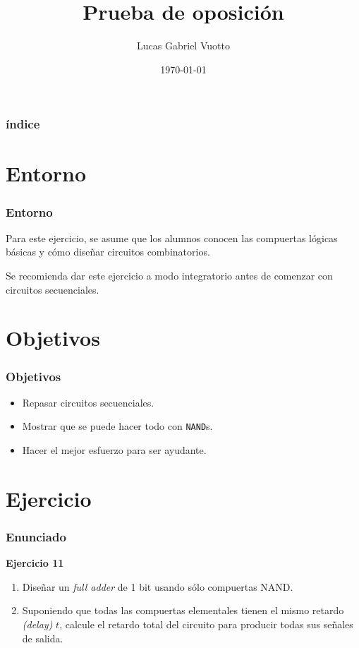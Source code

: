 \documentclass[mathserif,hyperref={pdfpagelabels=false}]{beamer}
\title{Prueba de oposición}
\author{Lucas Gabriel Vuotto}
\date{\today}
\begin{document}
\begin{frame}
\titlepage %
\end{frame}


\begin{frame}
\frametitle{índice}
\tableofcontents
\end{frame}


\section{Entorno}

\begin{frame}
\frametitle{Entorno}
Para este ejercicio, se asume que los alumnos conocen las compuertas lógicas
básicas y cómo diseñar circuitos combinatorios.

Se recomienda dar este ejercicio a modo integratorio antes de comenzar con
circuitos secuenciales.
\end{frame}


\section{Objetivos}

\begin{frame}
\frametitle{Objetivos}
\begin{itemize}
  \item Repasar circuitos secuenciales.
  \item Mostrar que se puede hacer todo con \texttt{NAND}s.
  \item Hacer el mejor esfuerzo para ser ayudante.
\end{itemize}
\end{frame}


\section{Ejercicio}

\begin{frame}
\frametitle{Enunciado}
\textbf{Ejercicio 11}
\begin{enumerate}
  \item Diseñar un \textit{full adder} de 1 bit usando sólo compuertas NAND.
  \item Suponiendo que todas las compuertas elementales tienen el mismo
  retardo \textit{(delay)} $t$, calcule el retardo total del circuito para
  producir todas sus señales de salida.
\end{enumerate}
\end{frame}
\end{document}
